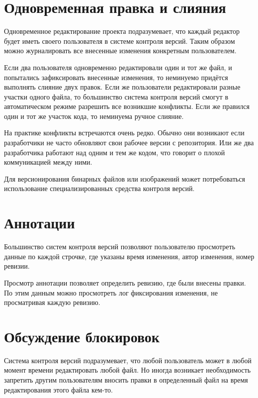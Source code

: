 
\section{ Одновременная правка и слияния } \label{sect3_7}

Одновременное редактирование проекта подразумевает, что каждый редактор будет иметь своего пользователя в системе контроля версий. Таким образом можно журналировать все внесенные изменения конкретным пользователем.

Если два пользователя одновременно редактировали один и тот же файл, и попытались зафиксировать внесенные изменения, то неминуемо придётся выполнять слияние двух правок. Если же пользователи редактировали разные участки одного файла, то большинство система контроля версий смогут в автоматическом режиме разрешить все возникшие конфликты. Если же правился один и тот же участок кода, то неминуема ручное слияние.

На практике конфликты встречаются очень редко. Обычно они возникают если разработчики не часто обновляют свои рабочее версии с репозитория. Или же два разработчика работают над одним и тем же кодом, что говорит о плохой коммуникацией между ними.

Для версионирования бинарных файлов или изображений может потребоваться использование специализированных средства контроля версий.

\section{ Аннотации } \label{sect3_8}

Большинство систем контроля версий позволяют пользователю просмотреть данные по каждой строчке, где указаны время изменения, автор изменения, номер ревизии.


Просмотр аннотации позволяет определить ревизию, где были внесены правки. По этим данным можно просмотреть лог фиксирования изменения, не просматривая каждую ревизию.

\section{ Обсуждение блокировок } \label{sect3_9}

Система контроля версий подразумевает, что любой пользователь может в любой момент времени редактировать любой файл. Но иногда возникает необходимость запретить другим пользователям вносить правки в определенный файл на время редактирования этого файла кем-то.

